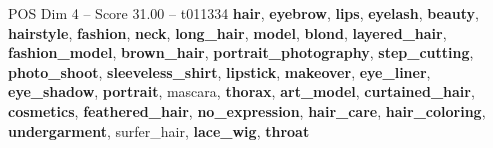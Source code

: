 \begin{textsample}{POS Dim 4 – Score 31.00 – t011334}  \label{ex:f4_pos_004}
\textbf{hair}, \textbf{eyebrow}, \textbf{lips}, \textbf{eyelash}, \textbf{beauty}, \textbf{hairstyle}, \textbf{fashion}, \textbf{neck}, \textbf{long\_hair}, \textbf{model}, \textbf{blond}, \textbf{layered\_hair}, \textbf{fashion\_model}, \textbf{brown\_hair}, \textbf{portrait\_photography}, \textbf{step\_cutting}, \textbf{photo\_shoot}, \textbf{sleeveless\_shirt}, \textbf{lipstick}, \textbf{makeover}, \textbf{eye\_liner}, \textbf{eye\_shadow}, \textbf{portrait}, mascara, \textbf{thorax}, \textbf{art\_model}, \textbf{curtained\_hair}, \textbf{cosmetics}, \textbf{feathered\_hair}, \textbf{no\_expression}, \textbf{hair\_care}, \textbf{hair\_coloring}, \textbf{undergarment}, surfer\_hair, \textbf{lace\_wig}, \textbf{throat}

\end{textsample}
